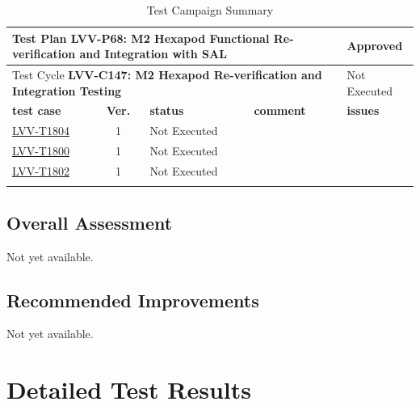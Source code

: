 \documentclass[SE,lsstdraft,STR,toc]{lsstdoc}
\begin{document}
{\small
\begin{longtable}{p{2cm}cp{2.3cm}p{8.6cm}p{2.3cm}}
\toprule
\multicolumn{4}{p{13.5cm}}{ Test Plan {\bf LVV-P68: M2 Hexapod Functional Re-verification and Integration with SAL }} & Approved \\\hline
\multicolumn{4}{p{13.5cm}}{ Test Cycle {\bf LVV-C147: M2 Hexapod Re-verification and Integration Testing }} & Not Executed \\\hline
\textbf{test case} & \textbf{Ver.} & \textbf{status} & \textbf{comment} & \textbf{issues} \\\toprule
\href{https://jira.lsstcorp.org/secure/Tests.jspa#/testCase/LVV-T1804}{LVV-T1804}
&  1
& Not Executed &
\begin{minipage}[]{9cm}
\smallskip

\medskip
\end{minipage}
&
\\\hline
\href{https://jira.lsstcorp.org/secure/Tests.jspa#/testCase/LVV-T1800}{LVV-T1800}
&  1
& Not Executed &
\begin{minipage}[]{9cm}
\smallskip

\medskip
\end{minipage}
&
\\\hline
\href{https://jira.lsstcorp.org/secure/Tests.jspa#/testCase/LVV-T1802}{LVV-T1802}
&  1
& Not Executed &
\begin{minipage}[]{9cm}
\smallskip

\medskip
\end{minipage}
&
\\\hline
\caption{Test Campaign Summary}
\label{table:summary}
\end{longtable}
}

\subsection{Overall Assessment}
\label{sect:overallassessment}

Not yet available.

\subsection{Recommended Improvements}
\label{sect:recommendations}

Not yet available.

\newpage
\section{Detailed Test Results}
\label{sect:detailedtestresults}
\end{document}
